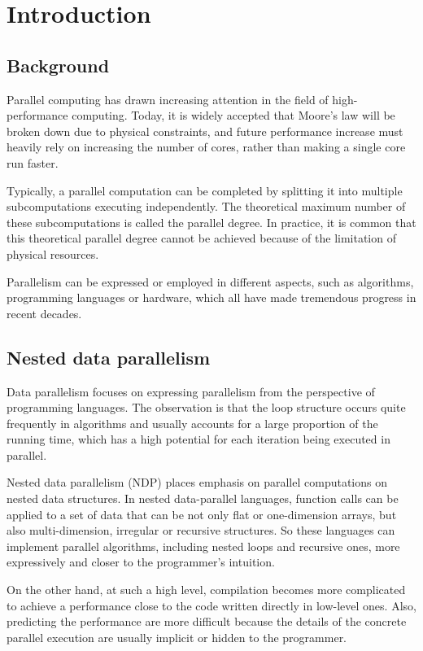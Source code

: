 
\chapter{Introduction}

\section{Background}

Parallel computing has drawn increasing attention in the field of high-performance computing.
Today, it is widely accepted that Moore's law will be broken down due to physical constraints, and future performance increase must heavily rely on increasing the number of cores, rather than making a single core run faster. 

Typically, a parallel computation can be completed by splitting it into multiple subcomputations executing independently.
The theoretical maximum number of these subcomputations is called the parallel degree. 
In practice, it is common that this theoretical parallel degree cannot be achieved because of the limitation of physical resources.

Parallelism can be expressed or employed in different aspects, such as algorithms, programming languages or hardware, which all have made tremendous progress in recent decades.


\section{Nested data parallelism}

Data parallelism focuses on expressing parallelism from the perspective of programming languages.
The observation is that the loop structure occurs quite frequently in algorithms and usually accounts for a large proportion of the running time, which has a high potential for each iteration being executed in parallel.
 
Nested data parallelism (NDP) places emphasis on parallel computations on nested data structures.
In nested data-parallel languages, function calls can be applied to a set of data that can be not only flat or one-dimension arrays, but also multi-dimension, irregular or recursive structures. 
So these languages can implement parallel algorithms, including nested loops and recursive ones, more expressively and closer to the programmer's intuition.

On the other hand, at such a high level, compilation becomes more complicated to achieve a performance close to the code written directly in low-level ones. 
Also, predicting the performance are more difficult because the details of the concrete parallel execution are usually implicit or hidden to the programmer.

